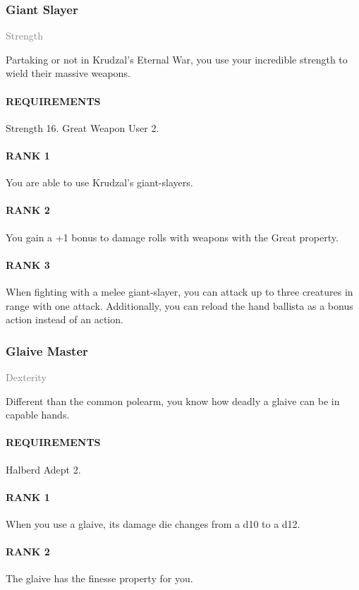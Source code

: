 \subsubsection{Giant Slayer} \label{tal::giantslayer}
\small{\textcolor{gray}{Strength}}

\normalsize
Partaking or not in Krudzal's Eternal War, you use your incredible strength to wield their massive weapons.
\paragraph{REQUIREMENTS} Strength 16. Great Weapon User 2.
\paragraph{RANK 1} You are able to use Krudzal's giant-slayers.
\paragraph{RANK 2} You gain a +1 bonus to damage rolls with weapons with the Great property.
\paragraph{RANK 3} When fighting with a melee giant-slayer, you can attack up to three creatures in range with one attack.
Additionally, you can reload the hand ballista as a bonus action instead of an action.

\subsubsection{Glaive Master} \label{tal::glaivemaster}
\small{\textcolor{gray}{Dexterity}}

\normalsize
Different than the common polearm, you know how deadly a glaive can be in capable hands.
\paragraph{REQUIREMENTS} Halberd Adept 2.
\paragraph{RANK 1} When you use a glaive, its damage die changes from a d10 to a d12.
\paragraph{RANK 2} The glaive has the finesse property for you.
